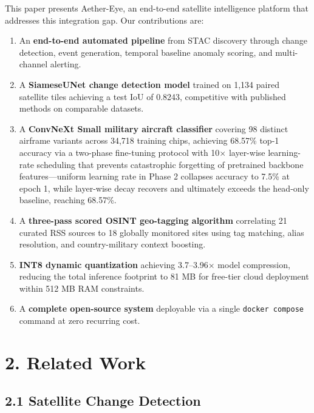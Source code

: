 \documentclass[11pt,a4paper]{article}
\providecommand{\tightlist}{\setlength{\itemsep}{0pt}\setlength{\parskip}{0pt}}
\begin{document}
This paper presents Aether-Eye, an end-to-end satellite intelligence platform that addresses this integration gap. Our contributions are:

\begin{enumerate}
\def\labelenumi{\arabic{enumi}.}
\tightlist
\item
  An \textbf{end-to-end automated pipeline} from STAC discovery through change detection, event generation, temporal baseline anomaly scoring, and multi-channel alerting.
\item
  A \textbf{SiameseUNet change detection model} trained on 1,134 paired satellite tiles achieving a test IoU of 0.8243, competitive with published methods on comparable datasets.
\item
  A \textbf{ConvNeXt Small military aircraft classifier} covering 98 distinct airframe variants across 34,718 training chips, achieving 68.57\% top-1 accuracy via a two-phase fine-tuning protocol with 10$\times$ layer-wise learning-rate scheduling that prevents catastrophic forgetting of pretrained backbone features---uniform learning rate in Phase 2 collapses accuracy to 7.5\% at epoch 1, while layer-wise decay recovers and ultimately exceeds the head-only baseline, reaching 68.57\%.
\item
  A \textbf{three-pass scored OSINT geo-tagging algorithm} correlating 21 curated RSS sources to 18 globally monitored sites using tag matching, alias resolution, and country-military context boosting.
\item
  \textbf{INT8 dynamic quantization} achieving 3.7--3.96× model compression, reducing the total inference footprint to 81 MB for free-tier cloud deployment within 512 MB RAM constraints.
\item
  A \textbf{complete open-source system} deployable via a single \texttt{docker\ compose} command at zero recurring cost.
\end{enumerate}

\hypertarget{related-work}{%
\section{2. Related Work}\label{related-work}}

\hypertarget{satellite-change-detection}{%
\subsection{2.1 Satellite Change Detection}\label{satellite-change-detection}}
\end{document}
